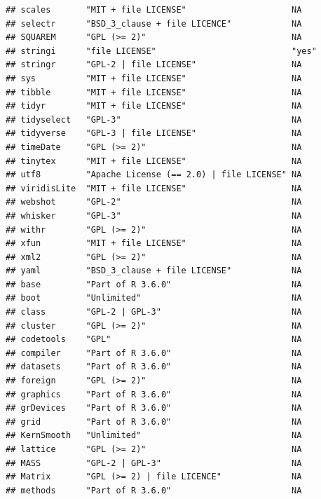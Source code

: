 \documentclass[]{article}
\begin{document}
\begin{verbatim}
## scales       "MIT + file LICENSE"                     NA             
## selectr      "BSD_3_clause + file LICENCE"            NA             
## SQUAREM      "GPL (>= 2)"                             NA             
## stringi      "file LICENSE"                           "yes"          
## stringr      "GPL-2 | file LICENSE"                   NA             
## sys          "MIT + file LICENSE"                     NA             
## tibble       "MIT + file LICENSE"                     NA             
## tidyr        "MIT + file LICENSE"                     NA             
## tidyselect   "GPL-3"                                  NA             
## tidyverse    "GPL-3 | file LICENSE"                   NA             
## timeDate     "GPL (>= 2)"                             NA             
## tinytex      "MIT + file LICENSE"                     NA             
## utf8         "Apache License (== 2.0) | file LICENSE" NA             
## viridisLite  "MIT + file LICENSE"                     NA             
## webshot      "GPL-2"                                  NA             
## whisker      "GPL-3"                                  NA             
## withr        "GPL (>= 2)"                             NA             
## xfun         "MIT + file LICENSE"                     NA             
## xml2         "GPL (>= 2)"                             NA             
## yaml         "BSD_3_clause + file LICENSE"            NA             
## base         "Part of R 3.6.0"                        NA             
## boot         "Unlimited"                              NA             
## class        "GPL-2 | GPL-3"                          NA             
## cluster      "GPL (>= 2)"                             NA             
## codetools    "GPL"                                    NA             
## compiler     "Part of R 3.6.0"                        NA             
## datasets     "Part of R 3.6.0"                        NA             
## foreign      "GPL (>= 2)"                             NA             
## graphics     "Part of R 3.6.0"                        NA             
## grDevices    "Part of R 3.6.0"                        NA             
## grid         "Part of R 3.6.0"                        NA             
## KernSmooth   "Unlimited"                              NA             
## lattice      "GPL (>= 2)"                             NA             
## MASS         "GPL-2 | GPL-3"                          NA             
## Matrix       "GPL (>= 2) | file LICENCE"              NA             
## methods      "Part of R 3.6.0"                        NA             

\end{verbatim}
\end{document}

